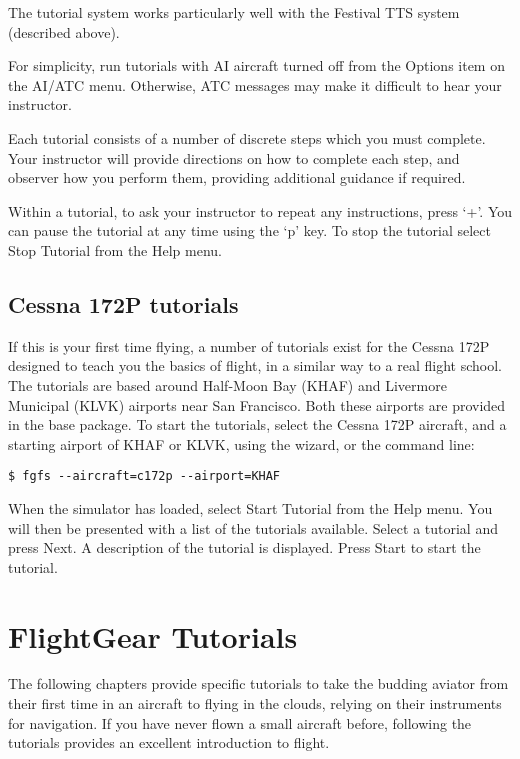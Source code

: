 The tutorial system works particularly well with the Festival TTS system 
(described above).

For simplicity, run tutorials with AI aircraft turned off from
the Options item on the AI/ATC menu. Otherwise, ATC messages 
may make it difficult to hear your instructor.

Each tutorial consists of a number of discrete steps which you must complete.
Your instructor will provide directions on how to complete each step, and
observer how you perform them, providing additional guidance if required.

Within a tutorial, to ask your instructor to repeat any instructions, press 
`+'. You can pause the tutorial at any time using the `p' key. To stop the 
tutorial select Stop Tutorial from the Help menu. 

\subsection{Cessna 172P tutorials}

If this is your first time flying, a number of tutorials exist for the
Cessna 172P designed to teach you the basics of flight, in a similar way to a
real flight school. The tutorials are based around Half-Moon Bay (KHAF) and
Livermore Municipal (KLVK) airports near San Francisco. Both these airports are
provided in the base package. To start the tutorials, select the Cessna 172P
aircraft, and a starting airport of KHAF or KLVK, using the wizard, or the
command line:

\begin{verbatim}
$ fgfs --aircraft=c172p --airport=KHAF
\end{verbatim}

When the simulator has loaded, select Start Tutorial from the Help menu. You
will then be presented with a list of the tutorials available. Select a tutorial
and press Next. A description of the tutorial is displayed. Press Start
 to start the tutorial.

\section{FlightGear Tutorials}

The following chapters provide \FlightGear{} specific tutorials
to take the budding aviator from their first time in an aircraft to flying in 
the clouds, relying on their instruments for navigation. If you have never flown
a small aircraft before, following the tutorials provides an excellent 
introduction to flight.

